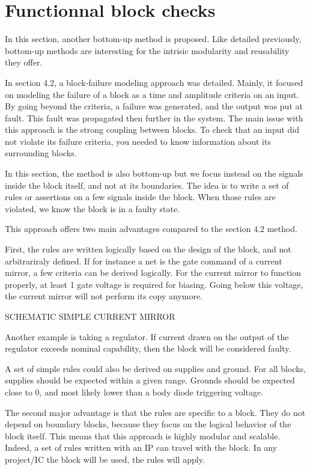 \section{Functionnal block checks}

In this section, another bottom-up method is proposed.
Like detailed previously, bottom-up methods are interesting for the intrisic modularity and reusability they offer.

In section 4.2, a block-failure modeling approach was detailed.
Mainly, it focused on modeling the failure of a block as a time and amplitude criteria on an input.
By going beyond the criteria, a failure was generated, and the output was put at fault.
This fault was propagated then further in the system.
The main issue with this approach is the strong coupling between blocks.
To check that an input did not violate its failure criteria, you needed to know information about its surrounding blocks.

In this section, the method is also bottom-up but we focus instead on the signals inside the block itself, and not at its boundaries.
The idea is to write a set of rules or assertions on a few signals inside the block.
When those rules are violated, we know the block is in a faulty state.

This approach offers two main advantages compared to the section 4.2 method.

First, the rules are written logically based on the design of the block, and not arbitrariraly defined.
If for instance a net is the gate command of a current mirror, a few criteria can be derived logically.
For the current mirror to function properly, at least 1 gate voltage is required for biasing.
Going below this voltage, the current mirror will not perform its copy anymore.

SCHEMATIC SIMPLE CURRENT MIRROR

Another example is taking a regulator.
If current drawn on the output of the regulator exceeds nominal capability, then the block will be considered faulty.

A set of simple rules could also be derived on supplies and ground.
For all blocks, supplies should be expected within a given range.
Grounds should be expected close to 0, and most likely lower than a body diode triggering voltage.

The second major advantage is that the rules are specific to a block.
They do not depend on boundary blocks, because they focus on the logical behavior of the block itself.
This means that this approach is highly modular and scalable.
Indeed, a set of rules written with an IP can travel with the block.
In any project/IC the block will be used, the rules will apply.

